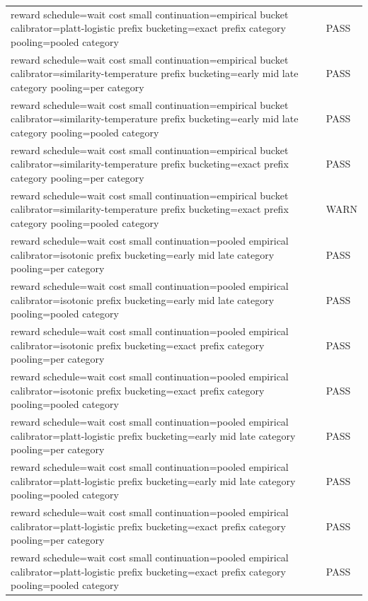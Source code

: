 \begin{table}[h]
\begin{tabular}{ll}
reward schedule=wait cost small  continuation=empirical bucket  calibrator=platt-logistic  prefix bucketing=exact prefix  category pooling=pooled category & PASS \\
reward schedule=wait cost small  continuation=empirical bucket  calibrator=similarity-temperature  prefix bucketing=early mid late  category pooling=per category & PASS \\
reward schedule=wait cost small  continuation=empirical bucket  calibrator=similarity-temperature  prefix bucketing=early mid late  category pooling=pooled category & PASS \\
reward schedule=wait cost small  continuation=empirical bucket  calibrator=similarity-temperature  prefix bucketing=exact prefix  category pooling=per category & PASS \\
reward schedule=wait cost small  continuation=empirical bucket  calibrator=similarity-temperature  prefix bucketing=exact prefix  category pooling=pooled category & WARN \\
reward schedule=wait cost small  continuation=pooled empirical  calibrator=isotonic  prefix bucketing=early mid late  category pooling=per category & PASS \\
reward schedule=wait cost small  continuation=pooled empirical  calibrator=isotonic  prefix bucketing=early mid late  category pooling=pooled category & PASS \\
reward schedule=wait cost small  continuation=pooled empirical  calibrator=isotonic  prefix bucketing=exact prefix  category pooling=per category & PASS \\
reward schedule=wait cost small  continuation=pooled empirical  calibrator=isotonic  prefix bucketing=exact prefix  category pooling=pooled category & PASS \\
reward schedule=wait cost small  continuation=pooled empirical  calibrator=platt-logistic  prefix bucketing=early mid late  category pooling=per category & PASS \\
reward schedule=wait cost small  continuation=pooled empirical  calibrator=platt-logistic  prefix bucketing=early mid late  category pooling=pooled category & PASS \\
reward schedule=wait cost small  continuation=pooled empirical  calibrator=platt-logistic  prefix bucketing=exact prefix  category pooling=per category & PASS \\
reward schedule=wait cost small  continuation=pooled empirical  calibrator=platt-logistic  prefix bucketing=exact prefix  category pooling=pooled category & PASS \\

\end{tabular}
\end{table}
